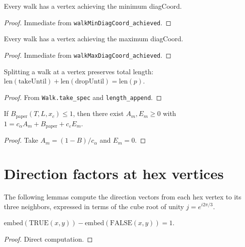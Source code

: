 \begin{lemma}
\begin{lemma}\label{lem:walk_has_min}
\leanok
{}
  Every walk has a vertex achieving the minimum diagCoord.
\end{lemma}
\begin{proof}\leanok Immediate from \texttt{walkMinDiagCoord\_achieved}.\end{proof}

\begin{lemma}\label{lem:walk_has_max}
\leanok
{}
  Every walk has a vertex achieving the maximum diagCoord.
\end{lemma}
\begin{proof}\leanok Immediate from \texttt{walkMaxDiagCoord\_achieved}.\end{proof}

\begin{lemma}\label{lem:walk_split_length}
\leanok
  Splitting a walk at a vertex preserves total length:
  $\mathrm{len}(\mathrm{takeUntil}) + \mathrm{len}(\mathrm{dropUntil}) = \mathrm{len}(p)$.
\end{lemma}
\begin{proof}\leanok From \texttt{Walk.take\_spec} and \texttt{length\_append}.\end{proof}

\begin{lemma}\label{lem:strip_from_B}
\leanok
  If $B_{\mathrm{paper}}(T,L,x_c) \leq 1$, then there exist $A_m, E_m \geq 0$
  with $1 = c_\alpha A_m + B_{\mathrm{paper}} + c_\varepsilon E_m$.
\end{lemma}
\begin{proof}\leanok
  Take $A_m = (1 - B) / c_\alpha$ and $E_m = 0$.
\end{proof}

\section{Direction factors at hex vertices}\label{sec:dir_factors}

The following lemmas compute the direction vectors from each hex vertex
to its three neighbors, expressed in terms of the cube root of unity
$j = e^{i2\pi/3}$.

\begin{lemma}\label{lem:dir_false_same}
\leanok
  $\mathrm{embed}(\mathrm{TRUE}(x,y)) - \mathrm{embed}(\mathrm{FALSE}(x,y)) = 1$.
\end{lemma}
\begin{proof}\leanok Direct computation.\end{proof}


\end{lemma}
